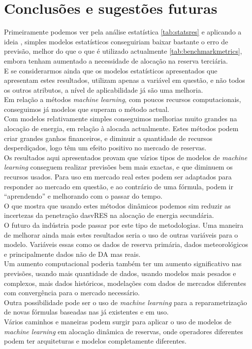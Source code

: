 \chapter{Conclusões e sugestões futuras}

Primeiramente podemos ver pela análise estatística \ref{tab:statsres} e aplicando a ideia \cite{Elsayed}, simples modelos estatísticos conseguiriam baixar bastante o erro de previsão, melhor do que o que é utilizado actualmente \ref{tab:benchmarkmetrics}, embora tenham aumentado a necessidade de alocação na reserva terciária.\\
E se considerarmos ainda que os modelos estatísticos apresentados que apresentam estes resultados, utilizam apenas a variável em questão, e não todos os outros atributos, a nível de aplicabilidade já são uma melhoria. \\
Em relação a métodos \textit{machine learning}, com poucos recursos computacionais, conseguimos já modelos que superam o método actual.\\
Com modelos relativamente simples conseguimos melhorias muito grandes na alocação de energia, em relação à alocada actualmente. Estes métodos podem criar grandes ganhos financeiros, e diminuir a quantidade de recursos desperdiçados, logo têm um efeito positivo no mercado de reservas.\\
Os resultados aqui apresentados provam que vários tipos de modelos de \textit{machine learning} conseguem realizar previsões bem mais exactas, e que diminuem os recursos usados. Para uso em mercado real estes podem ser adaptados para responder ao mercado em questão, e ao contrário de uma fórmula, podem ir “aprendendo” e melhorando com o passar do tempo.\\
O que mostra que usando estes métodos dinâmicos podemos sim reduzir as incertezas da penetração das\gls{vRES} na alocação de energia secundária.\\
O futuro da indústria pode passar por este tipo de metodologias. Uma maneira de melhorar ainda mais estes resultados seria o uso de outras variáveis para o modelo. Variáveis essas como os dados de reserva primária, dados meteorológicos e principalmente dados não de \gls{DA} mas reais.\\
Um aumento computacional poderia também ter um aumento significativo nas previsões, usando mais quantidade de dados, usando modelos mais pesados e complexos, mais dados históricos, modelações com dados de mercados diferentes com convergência para o mercado necessário.\\
Outra possibilidade pode ser o uso de \textit{machine learning} para a reparametrização de novas fórmulas baseadas nas já existentes e em uso.\\
Vários caminhos e maneiras podem surgir para aplicar o uso de modelos de \textit{machine learning} em alocação dinâmica de reservas, onde operadores diferentes podem ter arquiteturas e modelos completamente diferentes.
